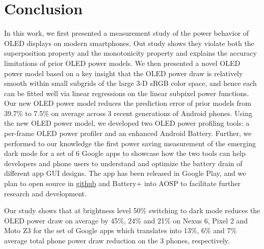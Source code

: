 \section{Conclusion}
\label{sec:conc}

In this work, we first presented a measurement study of the power behavior
of OLED displays on modern smartphones.
Out study shows they violate both the
superposition property and the monotonicity property and explains the
accuracy limitations of prior OLED power models. We then presented a
novel OLED power model based on a key
insight that the OLED power draw is relatively smooth within small
subgrids of the large 3-D sRGB color space, and hence each can be fitted
well via linear regressions on the linear subpixel power functions.
Our new OLED power model reduces the prediction error of prior models
from 39.7\% to 7.5\% on average across 3 recent generations of Android
phones.
Using the new OLED power model, we developed two OLED power
profiling tools: a per-frame OLED power profiler and an enhanced Android Battery.
%
Further, we performed to our knowledge the first power saving
measurement of the emerging dark mode for a set of 6 Google
apps to showcase how the two tools can help developers
and phone users to understand and optimize the battery drain of
different app GUI designs.
The \appwithlink app
has been released in Google Play, and
we
plan to open source \name in \url{github} and Battery+ into AOSP
to facilitate further research and development.



Our study shows that at brightness level 50\%
switching to dark mode reduces the OLED
power draw on average by 45\%, 24\% and 21\% on Nexus 6,
Pixel 2 and Moto Z3 for the set of
Google apps which translates into 13\%, 6\% and 7\%
average total phone power draw reduction on the 3 phones, respectively.
\fi
